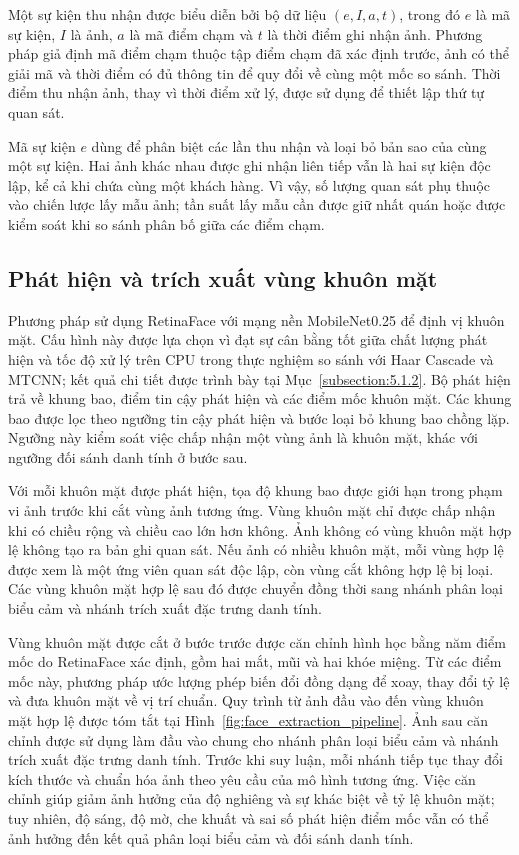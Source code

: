 \documentclass[../LuanVan.tex]{subfiles}
\begin{document}
Một sự kiện thu nhận được biểu diễn bởi bộ dữ liệu $(e,I,a,t)$, trong đó $e$ là mã sự kiện, $I$ là ảnh, $a$ là mã điểm chạm và $t$ là thời điểm ghi nhận ảnh. Phương pháp giả định mã điểm chạm thuộc tập điểm chạm đã xác định trước, ảnh có thể giải mã và thời điểm có đủ thông tin để quy đổi về cùng một mốc so sánh. Thời điểm thu nhận ảnh, thay vì thời điểm xử lý, được sử dụng để thiết lập thứ tự quan sát.

Mã sự kiện $e$ dùng để phân biệt các lần thu nhận và loại bỏ bản sao của cùng một sự kiện. Hai ảnh khác nhau được ghi nhận liên tiếp vẫn là hai sự kiện độc lập, kể cả khi chứa cùng một khách hàng. Vì vậy, số lượng quan sát phụ thuộc vào chiến lược lấy mẫu ảnh; tần suất lấy mẫu cần được giữ nhất quán hoặc được kiểm soát khi so sánh phân bố giữa các điểm chạm.

\subsection{Phát hiện và trích xuất vùng khuôn mặt}
\label{subsection:3.2.2}

Phương pháp sử dụng RetinaFace với mạng nền MobileNet0.25 để định vị khuôn mặt. Cấu hình này được lựa chọn vì đạt sự cân bằng tốt giữa chất lượng phát hiện và tốc độ xử lý trên CPU trong thực nghiệm so sánh với Haar Cascade và MTCNN; kết quả chi tiết được trình bày tại Mục~\ref{subsection:5.1.2}. Bộ phát hiện trả về khung bao, điểm tin cậy phát hiện và các điểm mốc khuôn mặt. Các khung bao được lọc theo ngưỡng tin cậy phát hiện và bước loại bỏ khung bao chồng lặp. Ngưỡng này kiểm soát việc chấp nhận một vùng ảnh là khuôn mặt, khác với ngưỡng đối sánh danh tính ở bước sau.

Với mỗi khuôn mặt được phát hiện, tọa độ khung bao được giới hạn trong phạm vi ảnh trước khi cắt vùng ảnh tương ứng. Vùng khuôn mặt chỉ được chấp nhận khi có chiều rộng và chiều cao lớn hơn không. Ảnh không có vùng khuôn mặt hợp lệ không tạo ra bản ghi quan sát. Nếu ảnh có nhiều khuôn mặt, mỗi vùng hợp lệ được xem là một ứng viên quan sát độc lập, còn vùng cắt không hợp lệ bị loại. Các vùng khuôn mặt hợp lệ sau đó được chuyển đồng thời sang nhánh phân loại biểu cảm và nhánh trích xuất đặc trưng danh tính.

Vùng khuôn mặt được cắt ở bước trước được căn chỉnh hình học bằng năm điểm mốc do RetinaFace xác định, gồm hai mắt, mũi và hai khóe miệng. Từ các điểm mốc này, phương pháp ước lượng phép biến đổi đồng dạng để xoay, thay đổi tỷ lệ và đưa khuôn mặt về vị trí chuẩn. Quy trình từ ảnh đầu vào đến vùng khuôn mặt hợp lệ được tóm tắt tại Hình~\ref{fig:face_extraction_pipeline}. Ảnh sau căn chỉnh được sử dụng làm đầu vào chung cho nhánh phân loại biểu cảm và nhánh trích xuất đặc trưng danh tính. Trước khi suy luận, mỗi nhánh tiếp tục thay đổi kích thước và chuẩn hóa ảnh theo yêu cầu của mô hình tương ứng. Việc căn chỉnh giúp giảm ảnh hưởng của độ nghiêng và sự khác biệt về tỷ lệ khuôn mặt; tuy nhiên, độ sáng, độ mờ, che khuất và sai số phát hiện điểm mốc vẫn có thể ảnh hưởng đến kết quả phân loại biểu cảm và đối sánh danh tính.
\end{document}
